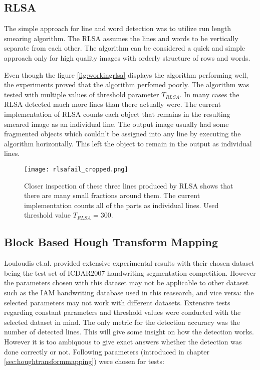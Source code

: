 \documentclass{article}
\begin{document}
    \subsection{RLSA}
      The simple approach for line and word detection was to utilize run length smearing algorithm. The RLSA assumes the lines and words to be vertically separate from each other. The algorithm can be considered a quick and simple approach only for high quality images with orderly structure of rows and words.

      Even though the figure \ref{fig:workingrlsa} displays the algorithm performing well, the experiments proved that the algorithm perfomed poorly. The algorithm was tested with multiple values of threshold parameter $T_{RLSA}$. In many cases the RLSA detected much more lines than there actually were. The current implementation of RLSA counts each object that remains in the resulting smeared image as an individual line. The output image usually had some fragmented objects which couldn't be assigned into any line by executing the algorithm horizontally. This left the object to remain in the output as individual lines.

      \begin{figure}[!ht]
        \centering
        \texttt{[image: rlsafail\_cropped.png]}
        \caption{Closer inspection of these three lines produced by RLSA shows that there are many small fractions around them. The current implementation counts all of the parts as individual lines. Used threshold value $T_{RLSA} = 300$.  \label{fig:strokewidthresults}}
      \end{figure}

    \subsection{Block Based Hough Transform Mapping}
      \label{sec:houghtransformevaluation}
      Louloudis et.al. provided extensive experimental results with their chosen dataset being the test set of ICDAR2007 handwriting segmentation competition. However the parameters chosen with this dataset may not be applicable to other dataset such as the IAM handwriting database used in this reasearch, and vice versa: the selected parameters may not work with different datasets. Extensive tests regarding constant parameters and threshold values were conducted with the selected dataset in mind. The only metric for the detection accuracy was the number of detected lines. This will give some insight on how the detection works. However it is too ambiquous to give exact answers whether the detection was done correctly or not. Following parameters (introduced in chapter \ref{sec:houghtransformmapping}) were chosen for tests:
\end{document}
